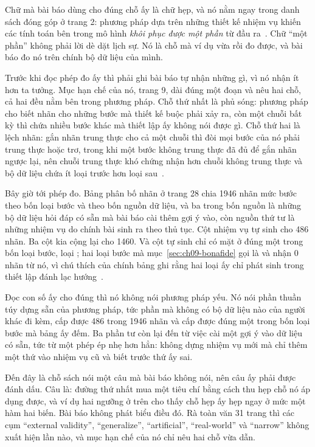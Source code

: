 %
Chữ mà bài báo dùng cho đúng chỗ ấy là chữ hẹp, và nó nằm ngay trong danh sách
đóng góp ở trang 2: phương pháp dựa trên những thiết kế nhiệm vụ khiến các tính
toán bên trong mô hình \emph{khôi phục được một phần} từ đầu
ra~\autocite{p21metrics}. Chữ \enquote{một phần} không phải lời dè dặt lịch sự.
Nó là chỗ mà ví dụ vừa rồi đo được, và bài báo đo nó trên chính bộ dữ liệu của
mình.

%
Trước khi đọc phép đo ấy thì phải ghi bài báo tự nhận những gì, vì nó nhận ít
hơn ta tưởng. Mục hạn chế của nó, trang 9, dài đúng một đoạn và nêu hai chỗ, cả
hai đều nằm bên trong phương pháp. Chỗ thứ nhất là phủ sóng: phương pháp cho
biết nhãn cho những bước mà thiết kế buộc phải xảy ra, còn một chuỗi bất kỳ thì
chứa nhiều bước khác mà thiết lập ấy không nói được gì. Chỗ thứ hai là lệch
nhãn: gắn nhãn trung thực cho cả một chuỗi thì đòi mọi bước của nó phải trung
thực hoặc trơ, trong khi một bước không trung thực đã đủ để gắn nhãn ngược lại,
nên chuỗi trung thực khó chứng nhận hơn chuỗi không trung thực và bộ dữ liệu
chứa ít loại trước hơn loại sau~\autocite{p21metrics}.

%
Bây giờ tới phép đo. Bảng phân bố nhãn ở trang 28 chia 1946 nhãn mức bước theo
bốn loại bước và theo bốn nguồn dữ liệu, và ba trong bốn nguồn là những bộ dữ
liệu hỏi đáp có sẵn mà bài báo cài thêm gợi ý vào, còn nguồn thứ tư là những
nhiệm vụ do chính bài sinh ra theo thủ tục. Cột nhiệm vụ tự sinh cho 486 nhãn.
Ba cột kia cộng lại cho 1460. Và cột tự sinh chỉ có mặt ở đúng một trong bốn
loại bước, loại ; hai loại bước
mà mục~\ref{sec:ch09-bonafide} gọi là  và
 nhận 0
nhãn từ nó, vì chú thích của chính bảng ghi rằng hai loại ấy chỉ phát sinh trong
thiết lập đánh lạc hướng~\autocite{p21metrics}.

Đọc con số ấy cho đúng thì nó không nói phương pháp yếu. Nó nói phần thuần túy
dựng sẵn của phương pháp, tức phần mà không có bộ dữ liệu nào của người khác đi
kèm, cấp được 486 trong 1946 nhãn và cấp được đúng một trong bốn loại bước mà
bảng ấy đếm. Ba phần tư còn lại đến từ việc cài một gợi ý vào dữ liệu có sẵn,
tức từ một phép ép nhẹ hơn hẳn: không dựng nhiệm vụ mới mà chỉ thêm một thứ vào
nhiệm vụ cũ và biết trước thứ ấy sai.

%
Đến đây là chỗ sách nói một câu mà bài báo không nói, nên câu ấy phải được đánh
dấu. Câu là: đường thứ nhất mua một tiêu chí bằng cách thu hẹp chỗ nó áp dụng
được, và ví dụ hai ngưỡng ở trên cho thấy chỗ hẹp ấy hẹp ngay ở mức một hàm hai
biến. Bài báo không phát biểu điều đó. Rà toàn văn 31 trang thì các cụm
\enquote{external validity}, \enquote{generalize}, \enquote{artificial},
\enquote{real-world} và \enquote{narrow} không xuất hiện lần nào, và mục hạn chế
của nó chỉ nêu hai chỗ vừa dẫn.

